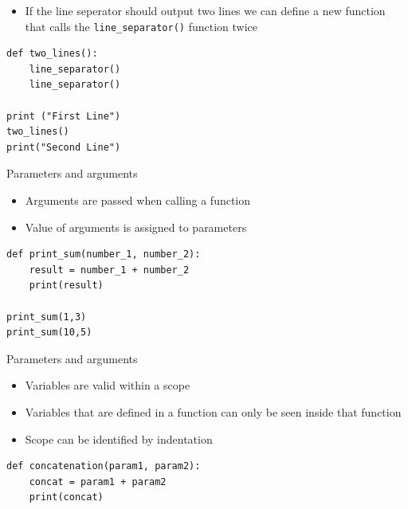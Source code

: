 \documentclass[10pt, a4paper]{beamer} %
\begin{document}
\begin{frame}
\framebreak

\begin{examples}
    \begin{itemize}
        \item If the line seperator should output two lines we can define a new function that calls the \lstinline!line_separator()! function twice
    \end{itemize}
    \begin{lstlisting}
def two_lines():
    line_separator()
    line_separator()

print ("First Line")
two_lines()
print("Second Line")       
    \end{lstlisting}
\end{examples}

\framebreak
\begin{block}{Parameters and arguments}
    \begin{itemize}
        \item Arguments are passed when calling a function
        \item Value of arguments is assigned to parameters
    \end{itemize}
    \begin{lstlisting}
def print_sum(number_1, number_2):
    result = number_1 + number_2
    print(result)

print_sum(1,3)
print_sum(10,5)
    \end{lstlisting}
\end{block}
\begin{block}{Parameters and arguments}
    \framebreak
    \begin{itemize}
        \item Variables are valid within a scope
        \item Variables that are defined in a function can only be seen inside that function
        \item Scope can be identified by indentation
    \end{itemize}
    \begin{lstlisting}
def concatenation(param1, param2):
    concat = param1 + param2
    print(concat)


\end{lstlisting}
\end{block}
\end{frame}
\end{document}
